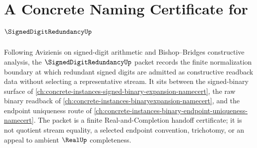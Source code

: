 \chapter{A Concrete Naming Certificate for $\SignedDigitRedundancyUp$}
\label{ch:concrete-instances-signed-digit-redundancy-namecert}

Following Avizienis on signed-digit arithmetic and Bishop--Bridges constructive analysis, the $\SignedDigitRedundancyUp$ packet records the finite normalization boundary at which redundant signed digits are admitted as constructive readback data without selecting a representative stream. It sits between the signed-binary surface of \autoref{ch:concrete-instances-signed-binary-expansion-namecert}, the raw binary readback of \autoref{ch:concrete-instances-binaryexpansion-namecert}, and the endpoint uniqueness route of \autoref{ch:concrete-instances-binary-endpoint-uniqueness-namecert}. The packet is a finite Real-and-Completion handoff certificate; it is not quotient stream equality, a selected endpoint convention, trichotomy, or an appeal to ambient $\RealUp$ completeness.

